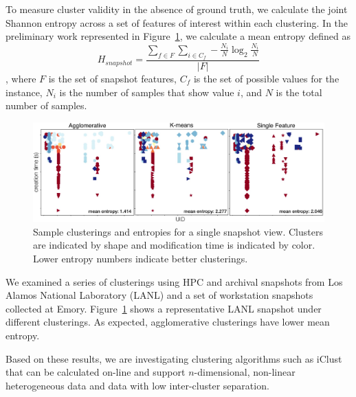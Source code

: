 To measure cluster validity in the absence of ground truth, we calculate the joint Shannon entropy across a set of features of
interest within each clustering.  In the preliminary work represented in
Figure~\ref{fig:clusterings},  we calculate a mean entropy defined as
\begin{equation}
    H_{snapshot} = \frac{\sum_{f\in F}\sum_{i \in C_f} -\frac{N_i}{N}\log_2{\frac{N_i}{N}}}{|F|}
\end{equation}, 
where $F$ is the set of snapshot features, $C_f$ is the set of possible values
for the instance, $N_i$ is the number of samples that show value $i$, and $N$ is
the total number of samples.
\begin{figure}
    \centering
    \includegraphics[width=.95\linewidth]{hotstorsnapshot.eps}
    \caption{Sample clusterings and entropies for a single snapshot view.
    Clusters are indicated by shape and modification time is indicated by color.
    Lower entropy numbers indicate better clusterings.}
    \label{fig:clusterings}
\end{figure}
We examined a series of clusterings using HPC and archival snapshots from Los Alamos
National Laboratory (LANL) and a set of workstation snapshots collected at Emory.
Figure~\ref{fig:clusterings} shows a representative LANL snapshot under
different clusterings. As expected, agglomerative clusterings have lower mean
entropy.    

Based on these results,
we
are investigating clustering algorithms such as iClust~\cite{TK} that can
be calculated on-line and support $n$-dimensional, non-linear heterogeneous data and data with low
inter-cluster separation.

